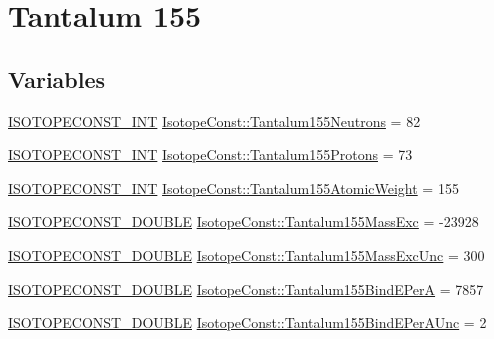 \hypertarget{group___isotope_const-_tantalum-_ta155}{}\section{Tantalum 155}
\label{group___isotope_const-_tantalum-_ta155}
\subsection*{Variables}
\begin{DoxyCompactItemize}
\item 
\mbox{\hyperlink{group___isotope_const-_macros_ga5f18360b3e99483a35c32d789e62621c}{I\+S\+O\+T\+O\+P\+E\+C\+O\+N\+S\+T\+\_\+\+I\+NT}} \mbox{\hyperlink{group___isotope_const-_tantalum-_ta155_ga61d35d071ed650514a9e506d11accb1d}{Isotope\+Const\+::\+Tantalum155\+Neutrons}} = 82
\item 
\mbox{\hyperlink{group___isotope_const-_macros_ga5f18360b3e99483a35c32d789e62621c}{I\+S\+O\+T\+O\+P\+E\+C\+O\+N\+S\+T\+\_\+\+I\+NT}} \mbox{\hyperlink{group___isotope_const-_tantalum-_ta155_ga9446f83937d0f59177cbae4de241c7f4}{Isotope\+Const\+::\+Tantalum155\+Protons}} = 73
\item 
\mbox{\hyperlink{group___isotope_const-_macros_ga5f18360b3e99483a35c32d789e62621c}{I\+S\+O\+T\+O\+P\+E\+C\+O\+N\+S\+T\+\_\+\+I\+NT}} \mbox{\hyperlink{group___isotope_const-_tantalum-_ta155_ga90a3eac7c5fb4082ee06972dfd617269}{Isotope\+Const\+::\+Tantalum155\+Atomic\+Weight}} = 155
\item 
\mbox{\hyperlink{group___isotope_const-_macros_ga8f45a7272ce02c0b4c65c44636ed719a}{I\+S\+O\+T\+O\+P\+E\+C\+O\+N\+S\+T\+\_\+\+D\+O\+U\+B\+LE}} \mbox{\hyperlink{group___isotope_const-_tantalum-_ta155_gab3fb35886370a6f71f4e3a75efc75ebe}{Isotope\+Const\+::\+Tantalum155\+Mass\+Exc}} = -\/23928
\item 
\mbox{\hyperlink{group___isotope_const-_macros_ga8f45a7272ce02c0b4c65c44636ed719a}{I\+S\+O\+T\+O\+P\+E\+C\+O\+N\+S\+T\+\_\+\+D\+O\+U\+B\+LE}} \mbox{\hyperlink{group___isotope_const-_tantalum-_ta155_gab644ad9192ec2937d5401342df300258}{Isotope\+Const\+::\+Tantalum155\+Mass\+Exc\+Unc}} = 300
\item 
\mbox{\hyperlink{group___isotope_const-_macros_ga8f45a7272ce02c0b4c65c44636ed719a}{I\+S\+O\+T\+O\+P\+E\+C\+O\+N\+S\+T\+\_\+\+D\+O\+U\+B\+LE}} \mbox{\hyperlink{group___isotope_const-_tantalum-_ta155_gabbe32d1e69616f1a03d287d45e08dd2b}{Isotope\+Const\+::\+Tantalum155\+Bind\+E\+PerA}} = 7857
\item 
\mbox{\hyperlink{group___isotope_const-_macros_ga8f45a7272ce02c0b4c65c44636ed719a}{I\+S\+O\+T\+O\+P\+E\+C\+O\+N\+S\+T\+\_\+\+D\+O\+U\+B\+LE}} \mbox{\hyperlink{group___isotope_const-_tantalum-_ta155_gac29f3bd9ca616c0f1bffad9f441a14d0}{Isotope\+Const\+::\+Tantalum155\+Bind\+E\+Per\+A\+Unc}} = 2

\end{DoxyCompactItemize}
